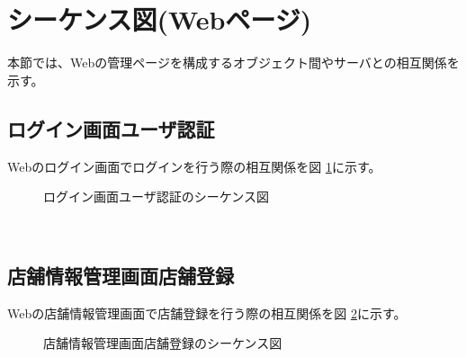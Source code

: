 \documentclass[a4j]{jarticle}
\begin{document}
\section{シーケンス図(Webページ)}
本節では、Webの管理ページを構成するオブジェクト間やサーバとの相互関係を示す。

\subsection{ログイン画面ユーザ認証}
Webのログイン画面でログインを行う際の相互関係を図 \ref {tab:oonishi1}に示す。
\begin{figure}[H]
\begin{center}
\caption{ログイン画面ユーザ認証のシーケンス図}
\label{tab:oonishi1}
\end{center}
\end{figure}　　
\subsection{店舗情報管理画面店舗登録}
Webの店舗情報管理画面で店舗登録を行う際の相互関係を図 \ref {tab:oonishi2}に示す。
\begin{figure}[H]
\begin{center}
\caption{店舗情報管理画面店舗登録のシーケンス図}
\label {tab:oonishi2}
\end{center}
\end{figure}
\end{document}
